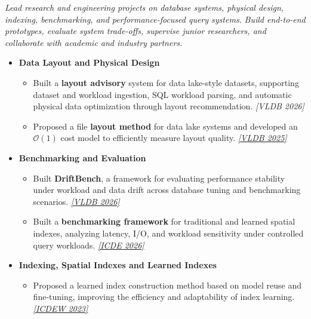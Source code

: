 \documentclass{resume}
\begin{document}

\textit{Lead research and engineering projects on database systems, physical design, indexing, benchmarking, and performance-focused query systems.}
\textit{Build end-to-end prototypes, evaluate system trade-offs, supervise junior researchers, and collaborate with academic and industry partners.}

\begin{itemize}[parsep=0.4ex]


\item \textbf{Data Layout and Physical Design}
\begin{itemize}[parsep=0.3ex]
    \item Built a \textbf{layout advisory} system for data lake-style datasets, supporting dataset and workload ingestion, SQL workload parsing, and automatic physical data optimization through layout recommendation.
    \href{https://github.com/Liuguanli/layout_advisor}{\faGithub}
    \textit{[VLDB 2026]}

    \item Proposed a file \textbf{layout method} for data lake systems and developed an \(\mathcal{O}(1)\) cost model to efficiently measure layout quality.
    \href{https://github.com/Liuguanli/LBMC}{\faGithub}
    \href{https://www.vldb.org/pvldb/vol17/p4773-liu.pdf}{\textit{[VLDB 2025\faExternalLink]}}
\end{itemize}

\item \textbf{Benchmarking and Evaluation}
\begin{itemize}[parsep=0.3ex]
    \item Built \textbf{DriftBench}, a framework for evaluating performance stability under workload and data drift across database tuning and benchmarking scenarios.
    \href{https://github.com/Liuguanli/DriftBench}{\faGithub}
    \href{https://arxiv.org/abs/2510.10858}{\textit{[VLDB 2026\faExternalLink]}}
    \item Built a \textbf{benchmarking framework} for traditional and learned spatial indexes, analyzing latency, I/O, and workload sensitivity under controlled query workloads. \href{https://github.com/Liuguanli/rl_spatial_benchmark}{\faGithub}
\href{https://arxiv.org/abs/2512.11161}{\textit{[ICDE 2026\faExternalLink]}}
\end{itemize}

\item \textbf{Indexing, Spatial Indexes and Learned Indexes}
\begin{itemize}[parsep=0.3ex]
    \item Proposed a learned index construction method based on model reuse and fine-tuning, improving the efficiency and adaptability of index learning.
\href{https://people.eng.unimelb.edu.au/jianzhongq/papers/DBML2023_ModelReuse.pdf}{\textit{[ICDEW 2023\faExternalLink]}}


\end{itemize}
\end{itemize}
\end{document}
